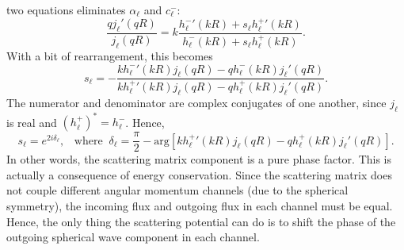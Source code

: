 \documentclass[pra,12pt]{revtex4}
\begin{document}
two equations eliminates $\alpha_\ell$ and $c_\ell^-$:
\begin{equation}
  \frac{q j_\ell'(qR)}{j_\ell(qR)} = k \frac{{h^-_\ell}'(kR) + s_\ell {h^+_\ell}'(kR)}{h^-_\ell(kR) + s_\ell h^+_\ell(kR)}.
\end{equation}
With a bit of rearrangement, this becomes
\begin{equation}
  s_\ell = - \frac{k{h_\ell^-}'(kR) j_\ell(qR) - qh_\ell^-(kR)j_\ell'(qR)}{k{h_\ell^+}'(kR) j_\ell(qR) - qh_\ell^+(kR)j_\ell'(qR)}.
\end{equation}
The numerator and denominator are complex conjugates of one another,
since $j_\ell$ is real and $(h_\ell^+)^* = h_\ell^-$.  Hence,
\begin{equation}
  s_\ell = e^{2i\delta_\ell}, \;\;\;\mathrm{where}\;\; \delta_\ell = \frac{\pi}{2} - \mathrm{arg}\!\left[k{h_\ell^+}'(kR) j_\ell(qR) - qh_\ell^+(kR)j_\ell'(qR)\right].
\end{equation}
In other words, the scattering matrix component is a pure phase
factor.  This is actually a consequence of energy conservation.  Since
the scattering matrix does not couple different angular momentum
channels (due to the spherical symmetry), the incoming flux and
outgoing flux in each channel must be equal.  Hence, the only thing
the scattering potential can do is to shift the phase of the outgoing
spherical wave component in each channel.
\end{document}
